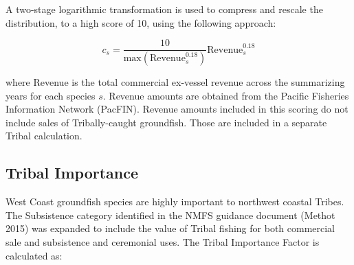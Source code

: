 \documentclass[11pt,
  english,
  a4paper,
]{article}
\begin{document}
\leavevmode\tagmcend\tagstructend\par


A two-stage logarithmic transformation is used to compress and rescale the distribution, to a high score of 10, using the following approach:

\leavevmode\tagmcend\tagstructend\par


\begin{equation}
  c_{s} = \frac{10}{\text{max}(\text{Revenue}_s^{0.18})}\text{Revenue}_s^{0.18} 
\end{equation}

\leavevmode\tagmcend\tagstructend\par


where Revenue is the total commercial ex-vessel revenue across the summarizing years for each species {\(s\)\leavevmode\tagmcend\tagstructend}. Revenue amounts are obtained from the Pacific Fisheries Information Network (PacFIN). Revenue amounts included in this scoring do not include sales of Tribally-caught groundfish. Those are included in a separate Tribal calculation.

\leavevmode\tagmcend\tagstructend\par


\hypertarget{tribal-importance}{%
\subsection{Tribal Importance}\label{tribal-importance}}

\leavevmode\tagmcend\tagstructend


West Coast groundfish species are highly important to northwest coastal Tribes. The Subsistence category identified in the NMFS guidance document {(Methot 2015)\leavevmode\tagmcend\tagstructend} was expanded to include the value of Tribal fishing for both commercial sale and subsistence and ceremonial uses. The Tribal Importance Factor is calculated as:

\leavevmode\tagmcend\tagstructend\par
\end{document}
